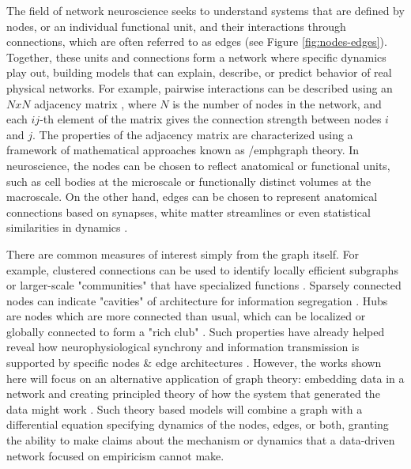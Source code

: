The field of network neuroscience seeks to understand systems that are defined by nodes, or an individual functional unit, and their interactions through connections, which are often referred to as edges (see Figure \ref{fig:nodes-edges}). Together, these units and connections form a network where specific dynamics play out, building models that can explain, describe, or predict behavior of real physical networks. For example, pairwise interactions can be described using an $NxN$ adjacency matrix \cite{bollobas_graph_1979}, where $N$ is the number of nodes in the network, and each $ij$-th element of the matrix gives the connection strength between nodes $i$ and $j$. The properties of the adjacency matrix are characterized using a framework of mathematical approaches known as /emph{graph theory}. In neuroscience, the nodes can be chosen to reflect anatomical or functional units, such as cell bodies at the microscale or functionally distinct volumes at the macroscale. On the other hand, edges can be chosen to represent anatomical connections based on synapses, white matter streamlines or even statistical similarities in dynamics \cite{he_small-world_2007,varshney_structural_2011,bassett_conserved_2011,friston_functional_2011}. 

There are common measures of interest simply from the graph itself. For example, clustered connections can be used to identify locally efficient subgraphs or larger-scale "communities" that have specialized functions \cite{sporns_modular_2016}. Sparsely connected nodes can indicate "cavities" of architecture for information segregation \cite{sizemore_cliques_2018,reimann_cliques_2017}. Hubs are nodes which are more connected than usual, which can be localized or globally connected to form a "rich club" \cite{bassett_small-world_2006}. Such properties have already helped reveal how neurophysiological synchrony and information transmission is supported by specific nodes \& edge architectures \cite{borgers_synchronization_2003,ganmor_sparse_2011,avena-koenigsberger_communication_2017}. However, the works shown here will focus on an alternative application of graph theory: embedding data in a network and creating principled theory of how the system that generated the data might work \cite{abbott_theoretical_2008}. Such theory based models will combine a graph with a differential equation specifying dynamics of the nodes, edges, or both, granting the ability to make claims about the mechanism or dynamics that a data-driven network focused on empiricism cannot make. 

